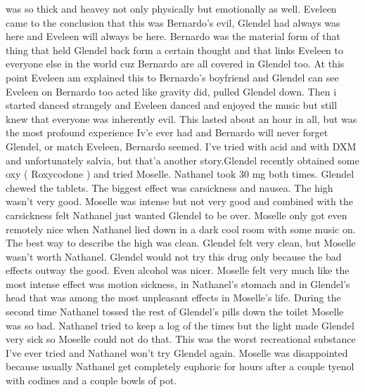 \documentclass[12pt]{book}
\begin{document}
was so thick and heavey not only physically but emotionally as well. Eveleen came to the conclusion that this was Bernardo's evil, Glendel had always was here and Eveleen will always be here. Bernardo was the material form of that thing that held Glendel back form a certain thought and that links Eveleen to everyone else in the world cuz Bernardo are all covered in Glendel too. At this point Eveleen am explained this to Bernardo's boyfriend and Glendel can see Eveleen on Bernardo too acted like gravity did, pulled Glendel down. Then i started danced strangely and Eveleen danced and enjoyed the music but still knew that everyone was inherently evil. This lasted about an hour in all, but was the most profound experience Iv'e ever had and Bernardo will never forget Glendel, or match Eveleen, Bernardo seemed. I've tried with acid and with DXM and unfortunately salvia, but that'a another story.Glendel recently obtained some oxy ( Roxycodone ) and tried Moselle. Nathanel took 30 mg both times. Glendel chewed the tablets. The biggest effect was carsickness and nausea. The high wasn't very good. Moselle was intense but not very good and combined with the carsickness felt Nathanel just wanted Glendel to be over. Moselle only got even remotely nice when Nathanel lied down in a dark cool room with some music on. The best way to describe the high was clean. Glendel felt very clean, but Moselle wasn't worth Nathanel. Glendel would not try this drug only because the bad effects outway the good. Even alcohol was nicer. Moselle felt very much like the most intense effect was motion sickness, in Nathanel's stomach and in Glendel's head that was among the most unpleasant effects in Moselle's life. During the second time Nathanel tossed the rest of Glendel's pills down the toilet Moselle was so bad. Nathanel tried to keep a log of the times but the light made Glendel very sick so Moselle could not do that. This was the worst recreational substance I've ever tried and Nathanel won't try Glendel again. Moselle was disappointed because usually Nathanel get completely euphoric for hours after a couple tyenol with codines and a couple bowls of pot.
\end{document}

